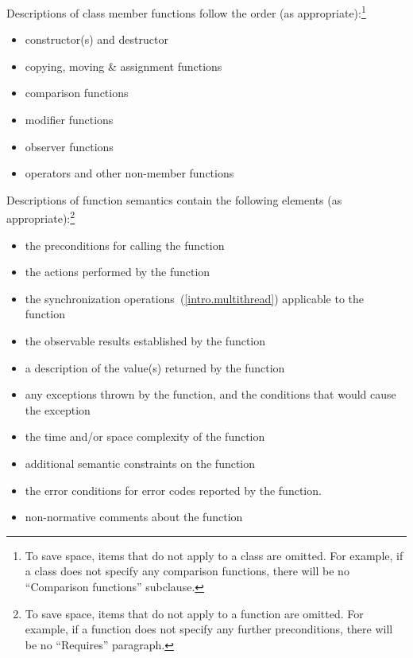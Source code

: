 \pnum
Descriptions of class member functions follow the order (as
appropriate):\footnote{To save space, items that do not apply to a class are omitted.
For example, if a class does not specify any comparison functions, there
will be no ``Comparison functions'' subclause.}

\begin{itemize}
\item constructor(s) and destructor
\item copying, moving \& assignment functions
\item comparison functions
\item modifier functions
\item observer functions
\item operators and other non-member functions
\end{itemize}

\pnum
Descriptions of function semantics contain the following elements (as
appropriate):\footnote{To save space, items that do not apply to a function are omitted.
For example, if a function does not specify any
further
preconditions, there will be no ``Requires'' paragraph.}

\begin{itemize}
\item \requires the preconditions for calling the function
\item \effects the actions performed by the function
\item \sync the synchronization operations~(\ref{intro.multithread}) applicable to the function
\item \postconditions the observable results established by the function
\item \returns a description of the value(s) returned by the function
\item \throws any exceptions thrown by the function, and the conditions that would cause the exception
\item \complexity the time and/or space complexity of the function
\item \notes additional semantic constraints on the function
\item \errors the error conditions for error codes reported by the function.
\item \realnotes non-normative comments about the function
\end{itemize}

